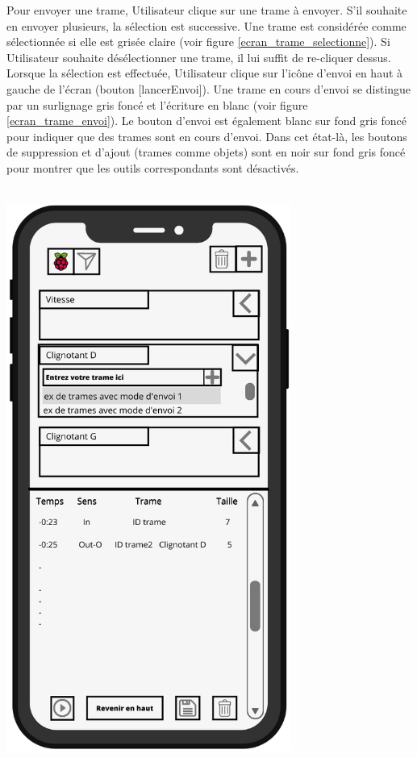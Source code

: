 Pour envoyer une trame, Utilisateur clique sur une trame à envoyer. S'il souhaite en envoyer plusieurs, la sélection est successive. Une trame est considérée comme sélectionnée si elle est grisée claire (voir figure \ref{ecran_trame_selectionne}). Si Utilisateur souhaite désélectionner une trame, il lui suffit de re-cliquer dessus. Lorsque la sélection est effectuée, Utilisateur clique sur l'icône d'envoi en haut à gauche de l'écran (bouton [lancerEnvoi]). Une trame en cours d'envoi se distingue par un surlignage gris foncé et l'écriture en blanc (voir figure \ref{ecran_trame_envoi}). Le bouton d'envoi est également blanc sur fond gris foncé pour indiquer que des trames sont en cours d'envoi. Dans cet état-là, les boutons de suppression et d'ajout (trames comme objets) sont en noir sur fond gris foncé pour montrer que les outils correspondants sont désactivés.
\\\\
\vspace{2cm}
\begin{minipage}{0.5\linewidth}
    \centering
    \includegraphics[width=0.7\textwidth]{sections/3_Exigences_specifiques/1_IHM/ihm/ecranPrincipalSelectionTrame.png}
    \captionsetup{justification=centering}
    \label{ecran_trame_selectionne}
\end{minipage}\hfill
